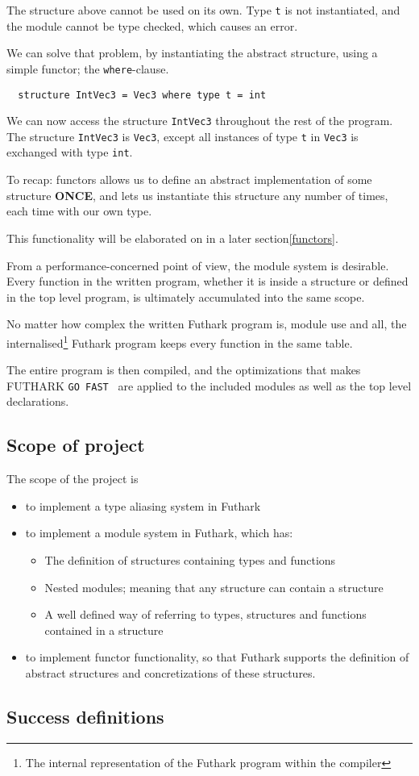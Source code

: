The structure above cannot be used on its own. Type \texttt{t} is not
instantiated, and the module cannot be type checked, which causes an error.

We can solve that problem, by instantiating the abstract structure, using a
simple functor; the \texttt{where}-clause.
\begin{verbatim}
  structure IntVec3 = Vec3 where type t = int
\end{verbatim}
We can now access the structure \texttt{IntVec3} throughout the rest of the
program. The structure \texttt{IntVec3} is \texttt{Vec3}, except all instances
of type \texttt{t} in \texttt{Vec3} is exchanged with type \texttt{int}.

To recap: functors allows us to define an abstract implementation of some
structure \textbf{ONCE}, and lets us instantiate this structure any number of
times, each time with our own type.

This functionality will be elaborated on in a later section\ref{functors}. 

From a performance-concerned point of view, the module system is desirable.
Every function in the written program, whether it is inside a structure
or defined in the top level program, is ultimately accumulated into the same
scope.

No matter how complex the written Futhark program is, module use and all, the
internalised\footnote{The internal representation of the Futhark program
  within the compiler} Futhark program keeps every function in the same table.

The entire program is then compiled, and the optimizations that makes FUTHARK \texttt{GO
FAST } are applied to the included modules as well as the top level declarations.

\subsection{Scope of project}
\label{subsec:project_scope}
The scope of the project is
\begin{itemize}
  \item to implement a type aliasing system in Futhark
  \item to implement a module system in Futhark, which has:
    \begin{itemize}
      \item The definition of structures containing types and functions
      \item Nested modules; meaning that any structure can contain a structure
      \item A well defined way of referring to types, structures and functions
        contained in a structure
    \end{itemize}
  \item to implement functor functionality, so that Futhark supports the
    definition of abstract structures and concretizations of these structures.
\end{itemize}

\subsection{Success definitions}
\label{subsec:label}


